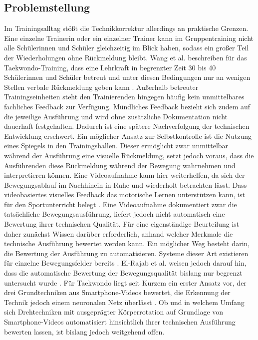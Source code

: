 \documentclass[intern]{cgMA}
\begin{document}
\subsection{Problemstellung}
Im Trainingsalltag stößt die Technikkorrektur allerdings an praktische Grenzen. Eine einzelne Trainerin oder ein einzelner Trainer kann im Gruppentraining nicht alle Schülerinnen und Schüler gleichzeitig im Blick haben, sodass ein großer Teil der Wiederholungen ohne Rückmeldung bleibt. Wang et al. \cite{Wang2026} beschreiben für das Taekwondo-Training, dass eine Lehrkraft in begrenzter Zeit 30 bis 40 Schülerinnen und Schüler betreut und unter diesen Bedingungen nur an wenigen Stellen verbale Rückmeldung geben kann \cite{Wang2026}. Außerhalb betreuter Trainingseinheiten steht den Trainierenden hingegen häufig kein unmittelbares fachliches Feedback zur Verfügung. Mündliches Feedback bezieht sich zudem auf die jeweilige Ausführung und wird ohne zusätzliche Dokumentation nicht dauerhaft festgehalten. Dadurch ist eine spätere Nachverfolgung der technischen Entwicklung erschwert.
Ein möglicher Ansatz zur Selbstkontrolle ist die Nutzung eines Spiegels in den Trainingshallen. Dieser ermöglicht zwar unmittelbar während der Ausführung eine visuelle Rückmeldung, setzt jedoch voraus, dass die Ausführenden diese Rückmeldung während der Bewegung wahrnehmen und interpretieren können. Eine Videoaufnahme kann hier weiterhelfen, da sich der Bewegungsablauf im Nachhinein in Ruhe und wiederholt betrachten lässt. Dass videobasiertes visuelles Feedback das motorische Lernen unterstützen kann, ist für den Sportunterricht belegt \cite{Moedinger2022}. Eine Videoaufnahme dokumentiert zwar die tatsächliche Bewegungsausführung, liefert jedoch nicht automatisch eine Bewertung ihrer technischen Qualität. Für eine eigenständige Beurteilung ist daher zunächst Wissen darüber erforderlich, anhand welcher Merkmale die technische Ausführung bewertet werden kann.
Ein möglicher Weg besteht darin, die Bewertung der Ausführung zu automatisieren. Systeme dieser Art existieren für einzelne Bewegungsfelder bereits \cite{Pham2022}. El-Rajab et al. \cite{ElRajab2025} weisen jedoch darauf hin, dass die automatische Bewertung der Bewegungsqualität bislang nur begrenzt untersucht wurde \cite{ElRajab2025}. Für Taekwondo liegt seit Kurzem ein erster Ansatz vor, der drei Grundtechniken aus Smartphone-Videos bewertet, die Erkennung der Technik jedoch einem neuronalen Netz überlässt \cite{Wang2026}. Ob und in welchem Umfang sich Drehtechniken mit ausgeprägter Körperrotation auf Grundlage von Smartphone-Videos automatisiert hinsichtlich ihrer technischen Ausführung bewerten lassen, ist bislang jedoch weitgehend offen.
\end{document}
